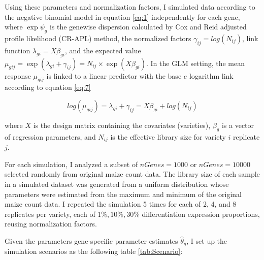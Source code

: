 Using these parameters and normalization factors, I simulated data according to the negative binomial model in equation \ref{eq:1} independently for each gene, where $\exp{\psi_g}$ is the genewise dispersion calculated by Cox and Reid adjusted profile likelihood (CR-APL) method, the normalized factors $\gamma_{ij} = log(N_{ij})$, link function $\lambda_{gi} = X\beta_{gi}$, and the expected value $\mu_{gij} = \exp{(\lambda_{gi}+\gamma_{ij})} = N_{ij} \times \exp{(X\beta_{gi})}$. In the GLM setting, the mean response $\mu_{gij}$ is linked to a linear predictor with the base $e$ logarithm link according to equation \ref{eq:7}

\begin{equation}
\label{eq:7}
log(\mu_{gij}) = \lambda_{gi}+\gamma_{ij} = X\beta_{gi} + log(N_{ij})
\end{equation}

where $X$ is the design matrix containing the covariates (varieties), $\beta_g$ is a vector of regression parameters, and $N_{ij}$ is the effective library size for variety $i$ replicate $j$.

For each simulation, I analyzed a subset of $nGenes=1000$ or $nGenes=10000$ selected randomly from original maize count data. The library size of each sample in a simulated dataset was generated from a uniform distribution whose parameters were estimated from the maximum and minimum of the original maize count data. I repeated the simulation 5 times for each of 2, 4, and 8 replicates per variety, each of $1\%, 10\%, 30\%$ differentiation expression proportions, reusing normalization factors. 

Given the parameters gene-specific parameter estimates $\hat{\theta}_g$, I set up the simulation scenarios as the following table \ref{tab:Scenario}:

